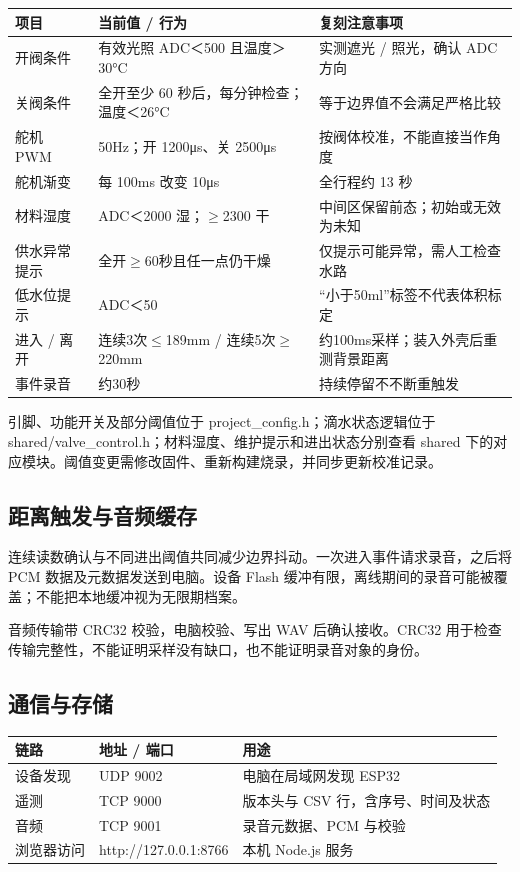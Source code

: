 \documentclass[10pt,a4paper]{article}
\begin{document}
\begin{longtable}{p{42mm}p{59mm}p{58mm}}
\toprule
\textbf{项目} & \textbf{当前值 / 行为} & \textbf{复刻注意事项}\\\midrule\endhead
开阀条件 & 有效光照 ADC＜500 且温度＞30°C & 实测遮光 / 照光，确认 ADC 方向\\
关阀条件 & 全开至少 60 秒后，每分钟检查；温度＜26°C & 等于边界值不会满足严格比较\\
舵机 PWM & 50Hz；开 1200μs、关 2500μs & 按阀体校准，不能直接当作角度\\
舵机渐变 & 每 100ms 改变 10μs & 全行程约 13 秒\\
材料湿度 & ADC＜2000 湿；$\geq$2300 干 & 中间区保留前态；初始或无效为未知\\
供水异常提示 & 全开$\geq$60秒且任一点仍干燥 & 仅提示可能异常，需人工检查水路\\
低水位提示 & ADC＜50 & “小于50ml”标签不代表体积标定\\
进入 / 离开 & 连续3次$\leq$189mm / 连续5次$\geq$220mm & 约100ms采样；装入外壳后重测背景距离\\
事件录音 & 约30秒 & 持续停留不不断重触发\\
\bottomrule\end{longtable}

引脚、功能开关及部分阈值位于 project\_config.h；滴水状态逻辑位于 shared/valve\_control.h；材料湿度、维护提示和进出状态分别查看 shared 下的对应模块。阈值变更需修改固件、重新构建烧录，并同步更新校准记录。


\subsection{距离触发与音频缓存}

连续读数确认与不同进出阈值共同减少边界抖动。一次进入事件请求录音，之后将 PCM 数据及元数据发送到电脑。设备 Flash 缓冲有限，离线期间的录音可能被覆盖；不能把本地缓冲视为无限期档案。


音频传输带 CRC32 校验，电脑校验、写出 WAV 后确认接收。CRC32 用于检查传输完整性，不能证明采样没有缺口，也不能证明录音对象的身份。


\clearpage

\subsection{通信与存储}

\begin{longtable}{p{42mm}p{59mm}p{58mm}}
\toprule
\textbf{链路} & \textbf{地址 / 端口} & \textbf{用途}\\\midrule\endhead
设备发现 & UDP 9002 & 电脑在局域网发现 ESP32\\
遥测 & TCP 9000 & 版本头与 CSV 行，含序号、时间及状态\\
音频 & TCP 9001 & 录音元数据、PCM 与校验\\
浏览器访问 & http://127.0.0.1:8766 & 本机 Node.js 服务\\
\bottomrule\end{longtable}
\end{document}
